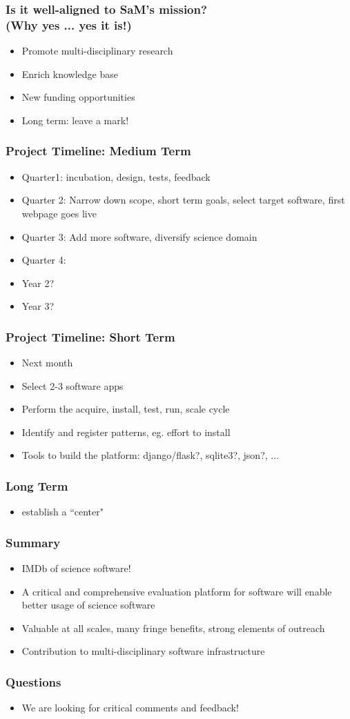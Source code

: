 \documentclass[hyperref={pdfpagelabels=false},12pt]{beamer}
\begin{document}
\begin{frame}
\frametitle{Is it well-aligned to SaM's mission? \\ (Why yes ... yes it is!)}
\begin{itemize}
\itemsep1em
\item 
Promote multi-disciplinary research
\item
Enrich knowledge base
\item
New funding opportunities
\item
Long term: leave a mark!
\end{itemize}
\end{frame}

\begin{frame}
\frametitle{Project Timeline: Medium Term}
\begin{itemize}
\itemsep1em
\item 
Quarter1: incubation, design, tests, feedback
\item
Quarter 2: Narrow down scope, short term goals, select target software, first webpage goes live
\item
Quarter 3: Add more software, diversify science domain
\item
Quarter 4:
\item
Year 2?
\item
Year 3?
\end{itemize}
\end{frame}

\begin{frame}
\frametitle{Project Timeline: Short Term}
\begin{itemize}
\itemsep1em
\item 
Next month
\item
Select 2-3 software apps
\item
Perform the acquire, install, test, run, scale cycle
\item
Identify and register patterns, eg. effort to install
\item
Tools to build the platform: django/flask?, sqlite3?, json?, ...
\end{itemize}
\end{frame}

\begin{frame}
\frametitle{Long Term}
\begin{itemize}
\item 
establish a ``center"
\end{itemize}
\end{frame}

\begin{frame}
\frametitle{Summary}
\begin{itemize}
\itemsep1em
\item IMDb of science software!
\item
A critical and comprehensive evaluation platform for software will enable better usage of science software
\item
Valuable at all scales, many fringe benefits, strong elements of outreach
\item
Contribution to multi-disciplinary software infrastructure
\end{itemize}
\end{frame}

\begin{frame}
\frametitle{Questions}
\begin{itemize}
\item We are looking for critical comments and feedback!
\end{itemize}
\end{frame}
\end{document}
